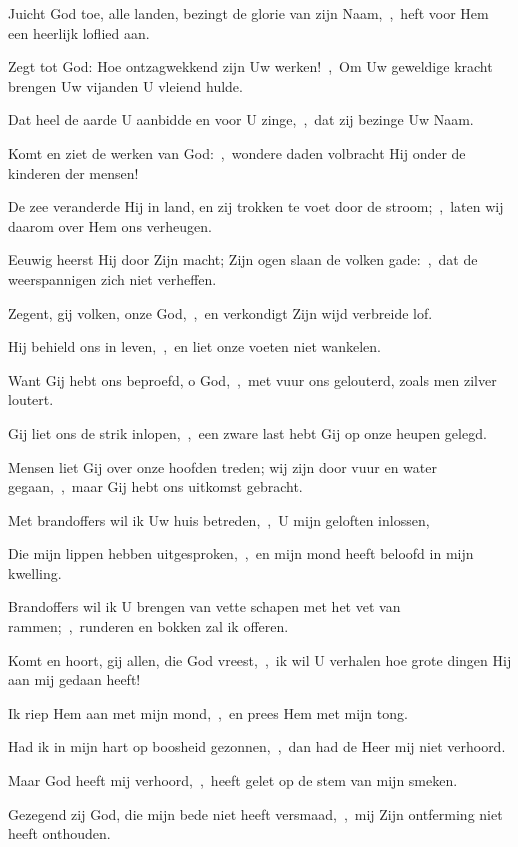 \documentclass[12pt,twoside,a5paper]{article}
\begin{document}
\begin{halfparskip}
   Juicht God toe, alle landen, bezingt de glorie van zijn Naam,~\sep\ heft voor Hem een heerlijk loflied aan.

  Zegt tot God: Hoe ontzagwekkend zijn Uw werken!~\sep\ Om Uw geweldige kracht brengen Uw vijanden U vleiend hulde.

  Dat heel de aarde U aanbidde en voor U zinge,~\sep\ dat zij bezinge Uw Naam.

  Komt en ziet de werken van God:~\sep\ wondere daden volbracht Hij onder de kinderen der mensen!

  De zee veranderde Hij in land, en zij trokken te voet door de stroom;~\sep\ laten wij daarom over Hem ons verheugen.

  Eeuwig heerst Hij door Zijn macht; Zijn ogen slaan de volken gade:~\sep\ dat de weerspannigen zich niet verheffen.

  Zegent, gij volken, onze God,~\sep\ en verkondigt Zijn wijd verbreide lof.

  Hij behield ons in leven,~\sep\ en liet onze voeten niet wankelen.

  Want Gij hebt ons beproefd, o God,~\sep\ met vuur ons gelouterd, zoals men zilver loutert.

  Gij liet ons de strik inlopen,~\sep\ een zware last hebt Gij op onze heupen gelegd.

  Mensen liet Gij over onze hoofden treden; wij zijn door vuur en water gegaan,~\sep\ maar Gij hebt ons uitkomst gebracht.

  Met brandoffers wil ik Uw huis betreden,~\sep\ U mijn geloften inlossen,

  Die mijn lippen hebben uitgesproken,~\sep\ en mijn mond heeft beloofd in mijn kwelling.

  Brandoffers wil ik U brengen van vette schapen met het vet van rammen;~\sep\ runderen en bokken zal ik offeren.

  Komt en hoort, gij allen, die God vreest,~\sep\ ik wil U verhalen hoe grote dingen Hij aan mij gedaan heeft!

  Ik riep Hem aan met mijn mond,~\sep\ en prees Hem met mijn tong.

  Had ik in mijn hart op boosheid gezonnen,~\sep\ dan had de Heer mij niet verhoord.

  Maar God heeft mij verhoord,~\sep\ heeft gelet op de stem van mijn smeken.

  Gezegend zij God, die mijn bede niet heeft versmaad,~\sep\ mij Zijn ontferming niet heeft onthouden.
\end{halfparskip}
\end{document}
